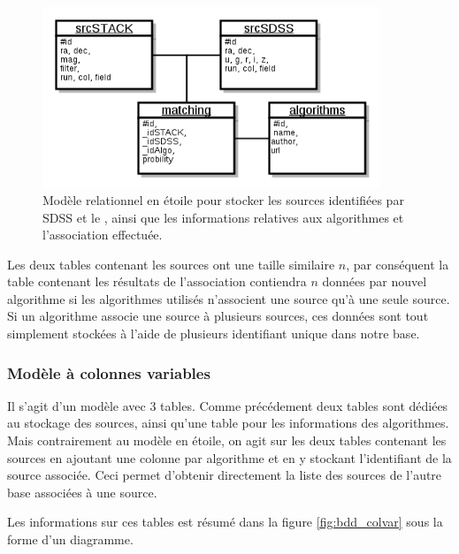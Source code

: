 	\begin{figure}[h]
		\centering
		\includegraphics[width=0.9\textwidth]{img/bdd_star.png}
		\caption[Modèle relationnel en étoile]{Modèle relationnel en étoile pour stocker les sources identifiées par SDSS et le \stack{}, ainsi que les informations relatives aux algorithmes et l'association effectuée.}
		\label{fig:bdd_star}
	\end{figure}

Les deux tables contenant les sources ont une taille similaire $n$, par conséquent la table contenant les résultats de l'association contiendra $n$ données par nouvel algorithme si les algorithmes utilisés n'associent une source qu'à une seule source. Si un algorithme associe une source à plusieurs sources, ces données sont tout simplement stockées à l'aide de plusieurs identifiant unique dans notre base.


		\subsubsection{Modèle à colonnes variables}
 
Il s'agit d'un modèle avec 3 tables. Comme précédement deux tables sont dédiées au stockage des sources, ainsi qu'une table pour les informations des algorithmes. Mais contrairement au modèle en étoile, on agit sur les deux tables contenant les sources en ajoutant une colonne par algorithme et en y stockant l'identifiant de la source associée. Ceci permet d'obtenir directement la liste des sources de l'autre base associées à une source.

Les informations sur ces tables est résumé dans la figure \ref{fig:bdd_colvar} sous la forme d'un diagramme.

